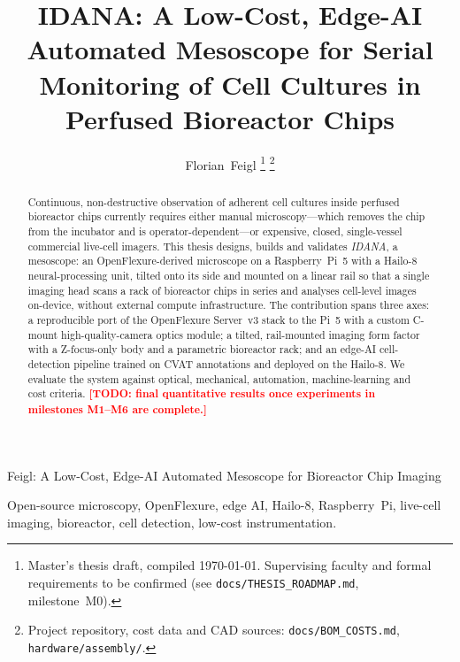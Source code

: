 \documentclass[journal,a4paper,10pt]{IEEEtran}
\newcommand{\todo}[1]{\textcolor{red}{\textbf{[TODO: #1]}}}
\begin{document}
\title{IDANA: A Low-Cost, Edge-AI Automated Mesoscope for Serial\\
Monitoring of Cell Cultures in Perfused Bioreactor Chips}

\author{Florian~Feigl%
\thanks{Master's thesis draft, compiled \today. Supervising faculty and formal
requirements to be confirmed (see \texttt{docs/THESIS\_ROADMAP.md}, milestone~M0).}%
\thanks{Project repository, cost data and CAD sources:
\texttt{docs/BOM\_COSTS.md}, \texttt{hardware/assembly/}.}}

%
{Feigl: A Low-Cost, Edge-AI Automated Mesoscope for Bioreactor Chip Imaging}

\maketitle

\begin{abstract}
Continuous, non-destructive observation of adherent cell cultures inside
perfused bioreactor chips currently requires either manual microscopy---which
removes the chip from the incubator and is operator-dependent---or expensive,
closed, single-vessel commercial live-cell imagers. This thesis designs, builds
and validates \emph{IDANA}, a mesoscope: an OpenFlexure-derived microscope on a
Raspberry~Pi~5 with a Hailo-8 neural-processing unit, tilted onto its side and
mounted on a linear rail so that a single imaging head scans a rack of
bioreactor chips in series and analyses cell-level images on-device, without
external compute infrastructure. The contribution spans three axes: a
reproducible port of the OpenFlexure Server~v3 stack to the Pi~5 with a
custom C-mount high-quality-camera optics module; a tilted, rail-mounted
imaging form factor with a Z-focus-only body and a parametric bioreactor rack;
and an edge-AI cell-detection pipeline trained on CVAT annotations and deployed
on the Hailo-8. We evaluate the system against optical, mechanical, automation,
machine-learning and cost criteria. \todo{final quantitative results once
experiments in milestones M1--M6 are complete.}
\end{abstract}

\begin{IEEEkeywords}
Open-source microscopy, OpenFlexure, edge AI, Hailo-8, Raspberry~Pi, live-cell
imaging, bioreactor, cell detection, low-cost instrumentation.
\end{IEEEkeywords}

\IEEEpeerreviewmaketitle

{\small\tableofcontents}













\appendices




\end{document}
